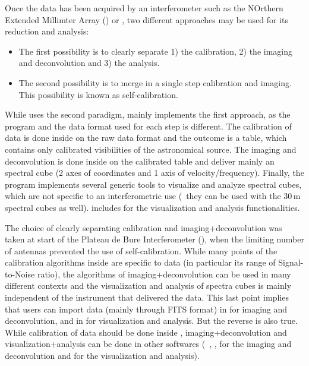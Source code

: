 Once the data has been acquired by an interferometer such as the 
NOrthern Extended Millimter Array  
(\NOEMA{}) or \ALMA{}, two different approaches may
be used for its reduction and analysis:
\begin{itemize}
\item The first possibility is to clearly separate 1) the calibration, 2)
  the imaging and deconvolution and 3) the analysis.
\item The second possibility is to merge in a single step calibration and
  imaging. This possibility is known as self-calibration.
\end{itemize}
While \casa{} uses the second paradigm, \gildas{} mainly implements 
the first approach, as the program and the data format used 
for each step is different. The calibration of \NOEMA{} data is
done inside \clic{} on the \NOEMA{} raw data format and the outcome is a
\uv{} table, which contains only calibrated visibilities of the
astronomical source.  The imaging and deconvolution is done inside
\imager{} on the calibrated \uv{} table and deliver mainly an \lmv{}
spectral cube (2 axes of coordinates and 1 axis of velocity/frequency).
Finally, the \greg{} program implements several generic tools to visualize and 
analyze  \lmv{} spectral cubes, which are not specific to an interferometric use 
(\eg\ they can be used with the \IRAM{} 30\,m spectral cubes as well).
\imager{} includes \greg{} for the  visualization and analysis functionalities.

The choice of clearly separating calibration and imaging+deconvolution was
taken at start of the Plateau de Bure Interferometer (\PdBI{}), 
when the limiting number of antennas prevented 
the use of self-calibration. 
While many points of the calibration algorithms
inside \clic{} are specific to \NOEMA{} data (in particular its range of
Signal-to-Noise ratio), the algorithms of imaging+deconvolution can be used
in many different contexts and the visualization and analysis of spectra
cubes is mainly independent of the instrument that delivered the data. 
This last point implies that users can import data (mainly through FITS format)
in \imager{} for imaging and deconvolution, and in \greg{} for
visualization and analysis. But the reverse is also true. While calibration
of \NOEMA{} data should be done inside \clic{}, imaging+deconvolution and
visualization+analysis can be done in other softwares (\eg\ \miriad{},
\aips{}, \casa{} for the imaging and deconvolution
and \karma{} for the visualization and analysis).

